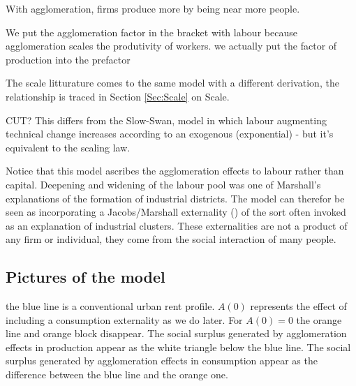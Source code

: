 With agglomeration, firms produce more by being near more people.

We put the agglomeration factor in the bracket with labour because agglomeration scales the produtivity of workers.
we actually put the factor of production into the prefactor

The scale litturature comes to the same model with a different derivation, the relationship is traced in Section \ref{Sec:Scale} on Scale. 

 CUT? This differs from  the Slow-Swan, model in which labour augmenting technical change increases according to an exogenous (exponential) - but it's equivalent to the scaling law.

Notice that this model ascribes the agglomeration effects to labour rather than capital. Deepening  and widening of the labour pool was one of Marshall's explanations of the formation of industrial districts. 
The model can therefor  be seen as incorporating a Jacobs/Marshall externality (\cite{Beaudry:2009ua, Panne:2004vb}) of the sort often invoked as an explanation of industrial clusters. 
These externalities  are not a product of any firm or individual, they come from the social interaction of many people.

\subsection{Pictures of the model}

the blue line is a conventional urban rent profile. $A(0)$ represents the effect of including a consumption externality as we do later.  For  $A(0)=0$ the orange line and orange block disappear. 
The social surplus generated by agglomeration effects in production appear as the white triangle below the blue line. The social surplus generated by agglomeration effects in consumption appear as the difference between the blue line and the orange one.
%


